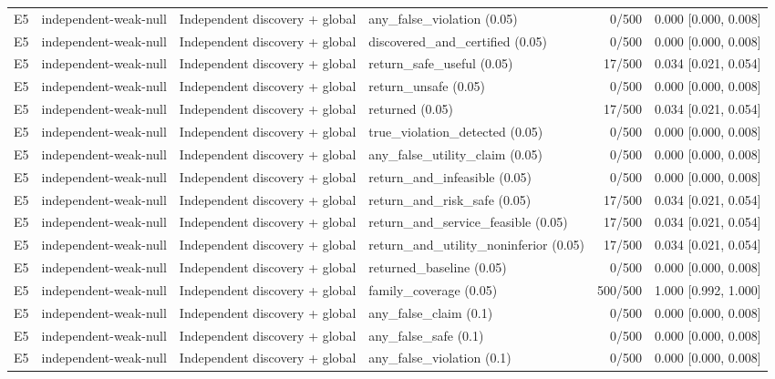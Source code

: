\begin{longtable}{p{.04\linewidth}p{.18\linewidth}p{.19\linewidth}p{.16\linewidth}r p{.21\linewidth}}
E5 & independent-weak-null & Independent discovery + global & any\_false\_violation (0.05) & 0/500 & 0.000 [0.000, 0.008]\\
E5 & independent-weak-null & Independent discovery + global & discovered\_and\_certified (0.05) & 0/500 & 0.000 [0.000, 0.008]\\
E5 & independent-weak-null & Independent discovery + global & return\_safe\_useful (0.05) & 17/500 & 0.034 [0.021, 0.054]\\
E5 & independent-weak-null & Independent discovery + global & return\_unsafe (0.05) & 0/500 & 0.000 [0.000, 0.008]\\
E5 & independent-weak-null & Independent discovery + global & returned (0.05) & 17/500 & 0.034 [0.021, 0.054]\\
E5 & independent-weak-null & Independent discovery + global & true\_violation\_detected (0.05) & 0/500 & 0.000 [0.000, 0.008]\\
E5 & independent-weak-null & Independent discovery + global & any\_false\_utility\_claim (0.05) & 0/500 & 0.000 [0.000, 0.008]\\
E5 & independent-weak-null & Independent discovery + global & return\_and\_infeasible (0.05) & 0/500 & 0.000 [0.000, 0.008]\\
E5 & independent-weak-null & Independent discovery + global & return\_and\_risk\_safe (0.05) & 17/500 & 0.034 [0.021, 0.054]\\
E5 & independent-weak-null & Independent discovery + global & return\_and\_service\_feasible (0.05) & 17/500 & 0.034 [0.021, 0.054]\\
E5 & independent-weak-null & Independent discovery + global & return\_and\_utility\_noninferior (0.05) & 17/500 & 0.034 [0.021, 0.054]\\
E5 & independent-weak-null & Independent discovery + global & returned\_baseline (0.05) & 0/500 & 0.000 [0.000, 0.008]\\
E5 & independent-weak-null & Independent discovery + global & family\_coverage (0.05) & 500/500 & 1.000 [0.992, 1.000]\\
E5 & independent-weak-null & Independent discovery + global & any\_false\_claim (0.1) & 0/500 & 0.000 [0.000, 0.008]\\
E5 & independent-weak-null & Independent discovery + global & any\_false\_safe (0.1) & 0/500 & 0.000 [0.000, 0.008]\\
E5 & independent-weak-null & Independent discovery + global & any\_false\_violation (0.1) & 0/500 & 0.000 [0.000, 0.008]\\

\end{longtable}
